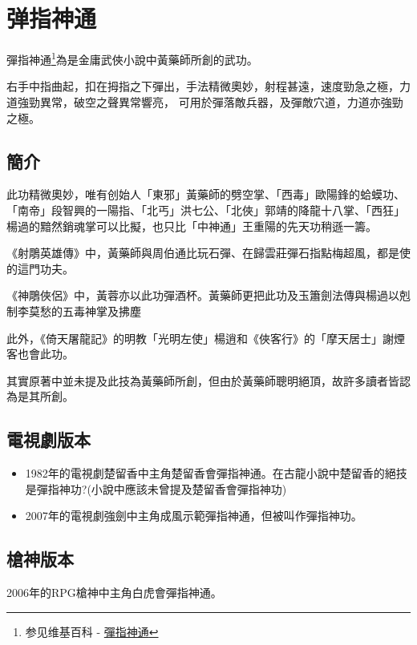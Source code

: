 \chapter{弹指神通}
彈指神通\footnote{参见维基百科 - \href{http://zh.wikipedia.org/wiki/\%E5\%BC\%B9\%E6\%8C\%87\%E7\%A5\%9E\%E9\%80\%9A}{彈指神通}}為是金庸武俠小說中黃藥師所創的武功。

右手中指曲起，扣在拇指之下彈出，手法精微奧妙，射程甚遠，速度勁急之極，力道強勁異常，破空之聲異常響亮，
可用於彈落敵兵器，及彈敵穴道，力道亦強勁之極。

\section{簡介}
此功精微奧妙，唯有创始人「東邪」黃藥師的劈空掌、「西毒」歐陽鋒的蛤蟆功、「南帝」段智興的一陽指、「北丐」洪七公、「北俠」郭靖的降龍十八掌、「西狂」楊過的黯然銷魂掌可以比擬，也只比「中神通」王重陽的先天功稍遜一籌。

《射鵰英雄傳》中，黃藥師與周伯通比玩石彈、在歸雲莊彈石指點梅超風，都是使的這門功夫。

《神鵰俠侶》中，黃蓉亦以此功彈酒杯。黃藥師更把此功及玉簫劍法傳與楊過以剋制李莫愁的五毒神掌及拂塵

此外，《倚天屠龍記》的明教「光明左使」楊逍和《俠客行》的「摩天居士」謝煙客也會此功。

其實原著中並未提及此技為黃藥師所創，但由於黃藥師聰明絕頂，故許多讀者皆認為是其所創。
\section{電視劇版本}
\begin{itemize}
\item 1982年的電視劇楚留香中主角楚留香會彈指神通。在古龍小說中楚留香的絕技是彈指神功?(小說中應該未曾提及楚留香會彈指神功)
\item 2007年的電視劇強劍中主角成風示範彈指神通，但被叫作彈指神功。
\end{itemize}
\section{槍神版本}
2006年的RPG槍神中主角白虎會彈指神通。

